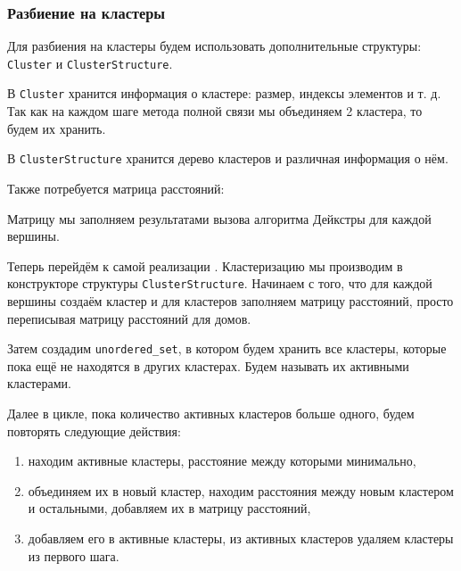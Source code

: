 \documentclass[11pt]{article}
\begin{document}
	\subsubsection{Разбиение на кластеры}

	Для разбиения на кластеры будем использовать дополнительные структуры: \texttt{Cluster} и \texttt{ClusterStructure}.
	
	В \texttt{Cluster} хранится информация о кластере: размер, индексы элементов и т. д. 
	Так как на каждом шаге метода полной связи мы объединяем 2 кластера, то будем их хранить.

	В \texttt{ClusterStructure} хранится дерево кластеров и различная информация о нём.

	

	

	Также потребуется матрица расстояний:
	

	Матрицу мы заполняем результатами вызова алгоритма Дейкстры для каждой вершины.

	Теперь перейдём к самой реализации \cite{wiki}.
	Кластеризацию мы производим в конструкторе структуры \texttt{ClusterStructure}. 
	Начинаем с того, что для каждой вершины создаём кластер и для кластеров заполняем матрицу расстояний, просто переписывая матрицу расстояний для домов.

	

	Затем создадим \texttt{unordered\_set}, в котором будем хранить все кластеры, которые пока ещё не находятся в других кластерах. 
	Будем называть их активными кластерами.

	

	Далее в цикле, пока количество активных кластеров больше одного, будем повторять следующие действия:
	\begin{enumerate}
		\item находим активные кластеры, расстояние между которыми минимально,
		\item объединяем их в новый кластер, находим расстояния между новым кластером и остальными, добавляем их в матрицу расстояний,
		\item добавляем его в активные кластеры, из активных кластеров удаляем кластеры из первого шага.
	\end{enumerate}
\end{document}
